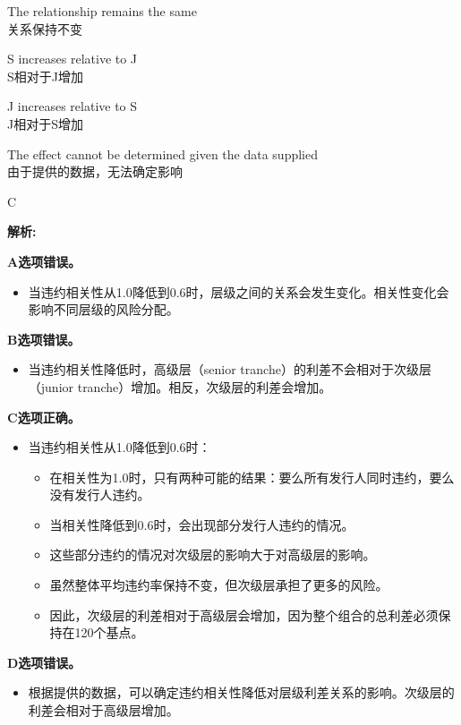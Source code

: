 \documentclass{article}
\newenvironment{explanation}
{\textbf{解析:}\par}
{\par}
\begin{document}
\begin{choices}
    \item The relationship remains the same\\
    关系保持不变
    \item S increases relative to J\\
    S相对于J增加
    \item J increases relative to S\\
    J相对于S增加
    \item The effect cannot be determined given the data supplied\\
    由于提供的数据，无法确定影响
\end{choices}

\begin{correctanswer}
    C
\end{correctanswer}

\begin{explanation}
    \textbf{A选项错误。}
    \begin{itemize}
    \item 当违约相关性从1.0降低到0.6时，层级之间的关系会发生变化。相关性变化会影响不同层级的风险分配。
    \end{itemize}

    \textbf{B选项错误。}
    \begin{itemize}
    \item 当违约相关性降低时，高级层（senior tranche）的利差不会相对于次级层（junior tranche）增加。相反，次级层的利差会增加。
    \end{itemize}

    \textbf{C选项正确。}
    \begin{itemize}
    \item 当违约相关性从1.0降低到0.6时：
    \begin{itemize}
        \item 在相关性为1.0时，只有两种可能的结果：要么所有发行人同时违约，要么没有发行人违约。
        \item 当相关性降低到0.6时，会出现部分发行人违约的情况。
        \item 这些部分违约的情况对次级层的影响大于对高级层的影响。
        \item 虽然整体平均违约率保持不变，但次级层承担了更多的风险。
        \item 因此，次级层的利差相对于高级层会增加，因为整个组合的总利差必须保持在120个基点。
    \end{itemize}
\end{itemize}
    \textbf{D选项错误。}
    \begin{itemize}
    \item 根据提供的数据，可以确定违约相关性降低对层级利差关系的影响。次级层的利差会相对于高级层增加。
    \end{itemize}
\end{explanation}
\end{document}
